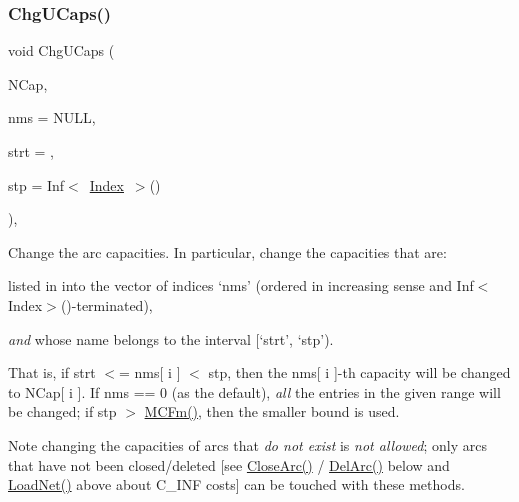 \subsubsection{\texorpdfstring{Chg\+U\+Caps()}{ChgUCaps()}}
{\footnotesize\ttfamily void Chg\+U\+Caps (\begin{DoxyParamCaption}\item[{\mbox{\hyperlink{class_m_c_f_class_ad325f3193dbba0ddef1da4e72d29eda6}{c\+F\+Row}}}]{N\+Cap,  }\item[{\mbox{\hyperlink{class_m_c_f_class_a81575b2d4e4d5636b17170432150ae69}{c\+Index\+\_\+\+Set}}}]{nms = {\ttfamily NULL},  }\item[{\mbox{\hyperlink{class_m_c_f_class_a76aaabb20535c51a2752b93f6c38fe54}{c\+Index}}}]{strt = {},  }\item[{\mbox{\hyperlink{class_m_c_f_class_ad53d6229d7ec28555a9c9c2fd9abf773}{Index}}}]{stp = {\ttfamily Inf$<$~\mbox{\hyperlink{class_m_c_f_class_ad53d6229d7ec28555a9c9c2fd9abf773}{Index}}~$>$()} }\end{DoxyParamCaption})\hspace{0.3cm}{\ttfamily [override]}, {\ttfamily [virtual]}}

Change the arc capacities. In particular, change the capacities that are\+:


\begin{DoxyItemize}
\item listed in into the vector of indices `nms' (ordered in increasing sense and Inf$<$\+Index$>$()-\/terminated),
\item {\itshape and} whose name belongs to the interval \mbox{[}`strt', `stp').
\end{DoxyItemize}

That is, if strt $<$= nms\mbox{[} i \mbox{]} $<$ stp, then the nms\mbox{[} i \mbox{]}-\/th capacity will be changed to N\+Cap\mbox{[} i \mbox{]}. If nms == 0 (as the default), {\itshape all} the entries in the given range will be changed; if stp $>$ \mbox{\hyperlink{class_m_c_f_class_ab4d5a0d0fc49882de0b4eb3146f1b7a6}{M\+C\+Fm()}}, then the smaller bound is used.

\begin{DoxyNote}{Note}
changing the capacities of arcs that {\itshape do not exist} is {\itshape not allowed}; only arcs that have not been closed/deleted \mbox{[}see \mbox{\hyperlink{class_m_c_f_simplex_a4a964ce79159307998f5acd0018d01b1}{Close\+Arc()}} / \mbox{\hyperlink{class_m_c_f_simplex_a3b6145c95b83f40a76d724eb2b92f80f}{Del\+Arc()}} below and \mbox{\hyperlink{class_m_c_f_simplex_ac270d18d58fd6fe88164cde1f4c80aff}{Load\+Net()}} above about C\+\_\+\+I\+NF costs\mbox{]} can be touched with these methods. 
\end{DoxyNote}


